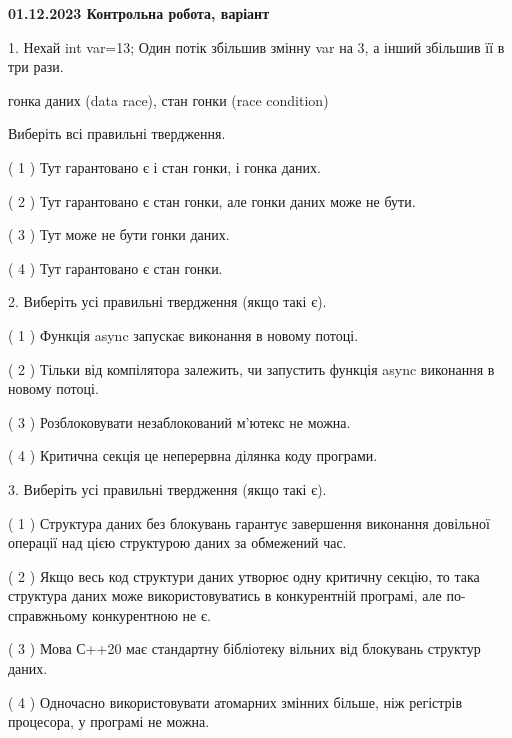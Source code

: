 \documentclass[12pt, ukrainian]{article}
\begin{document}
\vspace{4mm}
\newpage
\begin {large}

\textbf{01.12.2023 Контрольна робота, варіант  }\par


{
1. Нехай int var=13; Один потік збільшив змінну var на 3, а інший збільшив її в три рази.

гонка даних (data race), стан гонки (race condition)

Виберіть всі правильні твердження.\par
\vspace{2mm}
( 1 ) Тут гарантовано є і стан гонки, і гонка даних.%

( 2 ) Тут гарантовано є стан гонки, але гонки даних може не бути.%

( 3 ) Тут може не бути гонки даних.%

( 4 ) Тут гарантовано є стан гонки.%


\vspace{5mm}
2. Виберіть усі правильні твердження (якщо такі є).\par
\vspace{2mm}

( 1 ) Функція async запускає виконання в новому потоці.%

( 2 ) Тільки від компілятора залежить, чи запустить функція async виконання в новому потоці.%

( 3 ) Розблоковувати незаблокований м’ютекс не можна.%

( 4 ) Критична секція це неперервна ділянка коду програми.%


\vspace{5mm}
3. Виберіть усі правильні твердження (якщо такі є).\par
\vspace{2mm}

( 1 ) Структура даних без блокувань гарантує завершення виконання довільної операції над цією структурою даних за обмежений час.%

( 2 ) Якщо весь код структури даних утворює одну критичну секцію, то така структура даних може використовуватись в конкурентній програмі, але по-справжньому конкурентною не є.%

( 3 ) Мова С++20 має стандартну бібліотеку вільних від блокувань структур даних.%

( 4 ) Одночасно використовувати атомарних змінних більше, ніж регістрів процесора, у програмі не можна.%


}
\end{large}
\end{document}
